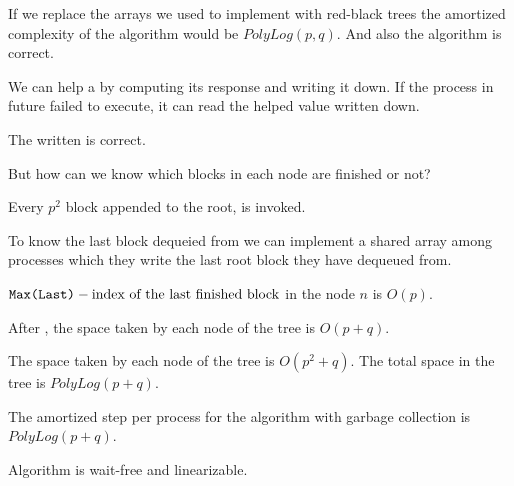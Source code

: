 \begin{lemma}
    If we replace the arrays we used to implement  with red-black trees the amortized complexity of the algorithm would be $PolyLog(p,q)$. And also the algorithm is correct.
\end{lemma}

We can help a  by computing its response and writing it down. If the process in future failed to execute, it can read the helped value written down.

\begin{lemma}
The  written is correct.
\end{lemma}

But how can we know which blocks in each node are finished or not? 

\begin{observation}
Every $p^2$ block appended to the root,  is invoked.  
\end{observation}

To know the last block dequeied from we can implement a shared array among processes which they write the last root block they have dequeued from. 

\begin{lemma}
    ${\normalfont{\texttt{Max(Last)}}} - \text{index of the last finished block}$ in the node $n$ is $O(p)$.
\end{lemma}

\begin{lemma}
    After , the space taken by each node of the tree is $O(p+q)$.
\end{lemma}

\begin{corollary}
The space taken by each node of the tree is $O(p^2+q)$. The total space in the tree is $PolyLog(p+q)$.
\end{corollary}

\begin{lemma}
  The amortized step per process for the algorithm with garbage collection is $PolyLog(p+q)$.
\end{lemma}

\begin{lemma}
  Algorithm is wait-free and linearizable.
\end{lemma}

